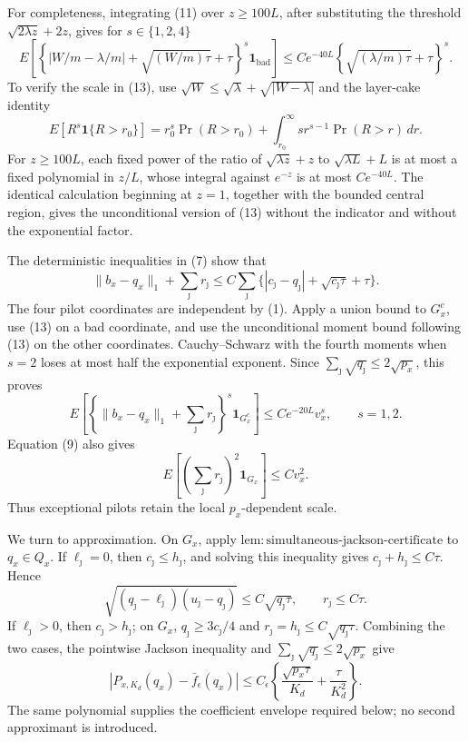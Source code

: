 For completeness, integrating (11) over \(z\geq100L\), after substituting the threshold \(\sqrt{2\lambda z}+2z\), gives for \(s\in\{1,2,4\}\)
\[
 E\!\left[
 \left\{|W/m-\lambda/m|+\sqrt{(W/m)\tau}+\tau\right\}^{s}
 \mathbf 1_{\mathrm{bad}}
 \right]
 \leq C e^{-40L}\left\{\sqrt{(\lambda/m)\tau}+\tau\right\}^{s}. \tag{13}
\]
To verify the scale in (13), use \(\sqrt W\leq\sqrt\lambda+\sqrt{|W-\lambda|}\) and the layer-cake identity
\[
 E[R^s\mathbf 1\{R>r_0\}]
 =r_0^s\Pr(R>r_0)+\int_{r_0}^{\infty}s r^{s-1}\Pr(R>r)\,dr.
\]
For \(z\geq100L\), each fixed power of the ratio of \(\sqrt{\lambda z}+z\) to \(\sqrt{\lambda L}+L\) is at most a fixed polynomial in \(z/L\), whose integral against \(e^{-z}\) is at most \(C e^{-40L}\).  The identical calculation beginning at \(z=1\), together with the bounded central region, gives the unconditional version of (13) without the indicator and without the exponential factor.

The deterministic inequalities in (7) show that
\[
 \|b_x-q_x\|_1+\sum_\jmath r_\jmath
 \leq C\sum_\jmath
 \{|c_\jmath-q_\jmath|+\sqrt{c_\jmath\tau}+\tau\}.              \tag{14}
\]
The four pilot coordinates are independent by (1).  Apply a union bound to \(G_x^c\), use (13) on a bad coordinate, and use the unconditional moment bound following (13) on the other coordinates.  Cauchy--Schwarz with the fourth moments when \(s=2\) loses at most half the exponential exponent.  Since \(\sum_\jmath\sqrt{q_\jmath}\leq2\sqrt{p_x}\), this proves
\[
 E\!\left[
 \left\{\|b_x-q_x\|_1+\sum_\jmath r_\jmath\right\}^{s}
 \mathbf1_{G_x^c}\right]
 \leq C e^{-20L}v_x^s,
 \qquad s=1,2.                                                      \tag{15}
\]
Equation (9) also gives
\[
 E\!\left[\left(\sum_\jmath r_\jmath\right)^2
 \mathbf1_{G_x}\right]\leq C v_x^2.                              \tag{16}
\]
Thus exceptional pilots retain the local \(p_x\)-dependent scale.

We turn to approximation.  On \(G_x\), apply \(\mathrm{lem:simultaneous\mbox{-}jackson\mbox{-}certificate}\) to \(q_x\in Q_x\).  If \(\ell_\jmath=0\), then \(c_\jmath\leq h_\jmath\), and solving this inequality gives \(c_\jmath+h_\jmath\leq C\tau\).  Hence
\[
 \sqrt{(q_\jmath-\ell_\jmath)(u_\jmath-q_\jmath)}
 \leq C\sqrt{q_\jmath\tau},
 \qquad r_\jmath\leq C\tau.                                    \tag{17}
\]
If \(\ell_\jmath>0\), then \(c_\jmath>h_\jmath\); on \(G_x\), \(q_\jmath\geq3c_\jmath/4\) and \(r_\jmath=h_\jmath\leq C\sqrt{q_\jmath\tau}\).  Combining the two cases, the pointwise Jackson inequality and \(\sum_\jmath\sqrt{q_\jmath}\leq2\sqrt{p_x}\) give
\[
 |P_{x,K_d}(q_x)-\bar f_\epsilon(q_x)|
 \leq C_\epsilon\left\{
 \frac{\sqrt{p_x\tau}}{K_d}+\frac{\tau}{K_d^2}\right\}.         \tag{18}
\]
The same polynomial supplies the coefficient envelope required below; no second approximant is introduced.

